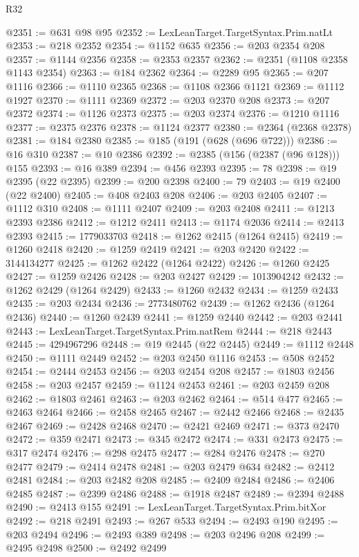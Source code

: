 \begin{lexlean}{R32}
\begin{coremodule}
@2351 := @631 @98 @95
@2352 := LexLeanTarget.TargetSyntax.Prim.natLt
@2353 := @218 @2352
@2354 := @1152 @635
@2356 := @203 @2354 @208
@2357 := @1144 @2356
@2358 := @2353 @2357
@2362 := @2351 (@1108 @2358 @1143 @2354)
@2363 := @184 @2362
@2364 := @2289 @95
@2365 := @207 @1116
@2366 := @1110 @2365
@2368 := @1108 @2366 @1121
@2369 := @1112 @1927
@2370 := @1111 @2369
@2372 := @203 @2370 @208
@2373 := @207 @2372
@2374 := @1126 @2373
@2375 := @203 @2374
@2376 := @1210 @1116
@2377 := @2375 @2376
@2378 := @1124 @2377
@2380 := @2364 (@2368 @2378)
@2381 := @184 @2380
@2385 := @185 (@191 (@628 (@696 @722)))
@2386 := @16 @310
@2387 := @10 @2386
@2392 := @2385 (@156 (@2387 (@96 @128))) @155
@2393 := @16 @389
@2394 := @456 @2393
@2395 := 78
@2398 := @19 @2395 (@22 @2395)
@2399 := @200 @2398
@2400 := 79
@2403 := @19 @2400 (@22 @2400)
@2405 := @408 @2403 @208
@2406 := @203 @2405
@2407 := @1112 @310
@2408 := @1111 @2407
@2409 := @203 @2408
@2411 := @1213 @2393 @2386
@2412 := @1212 @2411
@2413 := @1174 @2036
@2414 := @2413 @2393
@2415 := 1779033703
@2418 := @1262 @2415 (@1264 @2415)
@2419 := @1260 @2418
@2420 := @1259 @2419
@2421 := @203 @2420
@2422 := 3144134277
@2425 := @1262 @2422 (@1264 @2422)
@2426 := @1260 @2425
@2427 := @1259 @2426
@2428 := @203 @2427
@2429 := 1013904242
@2432 := @1262 @2429 (@1264 @2429)
@2433 := @1260 @2432
@2434 := @1259 @2433
@2435 := @203 @2434
@2436 := 2773480762
@2439 := @1262 @2436 (@1264 @2436)
@2440 := @1260 @2439
@2441 := @1259 @2440
@2442 := @203 @2441
@2443 := LexLeanTarget.TargetSyntax.Prim.natRem
@2444 := @218 @2443
@2445 := 4294967296
@2448 := @19 @2445 (@22 @2445)
@2449 := @1112 @2448
@2450 := @1111 @2449
@2452 := @203 @2450 @1116
@2453 := @508 @2452
@2454 := @2444 @2453
@2456 := @203 @2454 @208
@2457 := @1803 @2456
@2458 := @203 @2457
@2459 := @1124 @2453
@2461 := @203 @2459 @208
@2462 := @1803 @2461
@2463 := @203 @2462
@2464 := @514 @477
@2465 := @2463 @2464
@2466 := @2458 @2465
@2467 := @2442 @2466
@2468 := @2435 @2467
@2469 := @2428 @2468
@2470 := @2421 @2469
@2471 := @373 @2470
@2472 := @359 @2471
@2473 := @345 @2472
@2474 := @331 @2473
@2475 := @317 @2474
@2476 := @298 @2475
@2477 := @284 @2476
@2478 := @270 @2477
@2479 := @2414 @2478
@2481 := @203 @2479 @634
@2482 := @2412 @2481
@2484 := @203 @2482 @208
@2485 := @2409 @2484
@2486 := @2406 @2485
@2487 := @2399 @2486
@2488 := @1918 @2487
@2489 := @2394 @2488
@2490 := @2413 @155
@2491 := LexLeanTarget.TargetSyntax.Prim.bitXor
@2492 := @218 @2491
@2493 := @267 @533
@2494 := @2493 @190
@2495 := @203 @2494
@2496 := @2493 @389
@2498 := @203 @2496 @208
@2499 := @2495 @2498
@2500 := @2492 @2499

\end{coremodule}
\end{lexlean}
